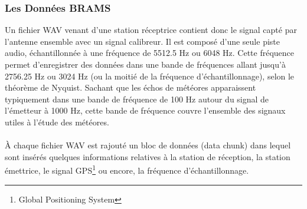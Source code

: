\documentclass[11pt]{article}
\begin{document}
\subsubsection{Les Données BRAMS}

Un fichier WAV venant d'une station réceptrice contient donc le signal capté par l'antenne ensemble avec un signal calibreur.
Il est composé d'une seule piste audio, échantillonnée à une fréquence de 5512.5 Hz ou 6048 Hz.
Cette fréquence permet d'enregistrer des données dans une bande de fréquences allant jusqu'à 2756.25 Hz ou 3024 Hz (ou la moitié de la fréquence d'échantillonnage), selon le théorème de Nyquist.
Sachant que les échos de météores apparaissent typiquement dans une bande de fréquence de 100 Hz autour du signal de l'émetteur à 1000 Hz, cette bande de fréquence couvre l'ensemble des signaux utiles à l'étude des météores.\\
\\
À chaque fichier WAV est rajouté un bloc de données (data chunk) dans lequel sont insérés quelques informations relatives à la station de réception, la station émettrice, le signal GPS\footnote{Global Positioning System} ou encore, la fréquence d'échantillonnage.
\end{document}
